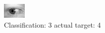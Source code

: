 \begin{figure}[h!]
\begin{center}
\includegraphics[width=0.60\columnwidth]{figures/ID689_class_3_target_4.png}
\end{center}
\caption{ Classification: 3 actual target: 4}
\label{fig:ID689_class_3_target_4}
\end{figure}
